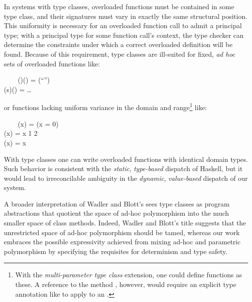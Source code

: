 In systems with type classes, overloaded functions must be contained in some
type class, and their signatures must vary in exactly the same structural
position. This uniformity is necessary for an overloaded function call to
admit a principal type; with a principal type for some function call's context,
the type checker can determine the constraints under which a correct overloaded
definition will be found. Because of this requirement, type classes are ill-suited
for fixed, \emph{ad hoc} sets of overloaded functions like:
\begin{FortressCode}
{\tt ~~~~}\+(\ultrathin)\COLON (\ultrathin) = (\hbox{\rm{}``\verythin''}) \\
    (s\COLON {})\COLON (\ultrathin) = \ldots\-
\end{FortressCode}
or functions lacking uniform variance in the domain and range\footnote{With the
\emph{multi-parameter type class} extension, one could define functions as these.
A reference to the method , however, would require an explicit type
annotation like  to apply to an .} like:
\begin{FortressCode}
{\tt ~~~~}\+(x\COLON {})\COLON {} = (x = 0) \\
    (x\COLON {})\COLON {} =\;  x  1  2  \\
    (x\COLON {})\COLON {} = x\-
\end{FortressCode}
With type classes one can write overloaded functions with identical domain
types. Such behavior is consistent with the \emph{static}, \emph{type-based}
dispatch of Haskell, but it would lead to irreconcilable ambiguity in the
\emph{dynamic}, \emph{value-based} dispatch of our system.

A broader interpretation of Wadler and Blott's \cite{wadler89} sees type
classes as program abstractions that quotient the space of ad-hoc polymorphism
into the much smaller space of class methods. Indeed, Wadler and Blott's title
suggests that the unrestricted space of ad-hoc polymorphism should be tamed,
whereas our work embraces the possible expressivity achieved from mixing ad-hoc
and parametric polymorphism by specifying the requisites for determinism and type safety.
